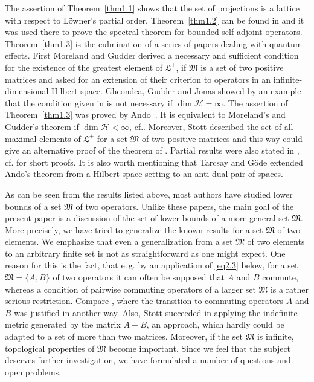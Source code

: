 \documentclass[12pt, a4paper, reqno, twoside]{amsart}
\numberwithin{equation}{section}
\newcommand{\frakL}{\mathfrak L}
\newcommand{\frakM}{\mathfrak M}
\newcommand{\eg}{\mbox{e.\,g.}\xspace}
\newcommand{\cf}{\mbox{cf.}\xspace}
\theoremstyle{definition}
\theoremstyle{remark}
\theoremstyle{mystyle}
\begin{document}
The assertion of Theorem~\ref{thm1.1} shows that the set of
projections is a lattice with respect to L\"owner's partial
order. Theorem~\ref{thm1.2} can be found in \cite[Nr.~108]{RieszNagy1973}
and it was used there to prove the spectral theorem for bounded
self-adjoint operators. Theorem~\ref{thm1.3} is the culmination of a series
of papers dealing with quantum effects. First Moreland and Gudder
\cite{MorelandGudder1999} derived a necessary and sufficient condition
for  the existence of the greatest element of $\frakL^{+}$, if  $\frakM$ is
a set  of two positive matrices and asked for an extension of their
criterion to operators in an infinite-dimensional Hilbert space.
Gheondea, Gudder and Jonas \cite{GheondeaGudderJonas2005}
showed by an example that the condition given in \cite{MorelandGudder1999} 
is not necessary if $\dim\mathscr H=\infty$. The assertion of
Theorem~\ref{thm1.3} was proved by Ando~\cite{Ando1999}. It is
equivalent to Moreland's and Gudder's theorem if $\dim\mathscr
H<\infty$, \cf \cite{Ando2005}. Moreover, Stott
\cite[Cor.~3.5]{Stott2016arxiv} described the set of all maximal
elements of  $\frakL^{+}$ for a set $\frakM$ of two positive matrices
and this way could give an alternative proof of the theorem of
\cite{MorelandGudder1999}. Partial results were also stated in 
\cite{YuanDu2006}, \cf \cite{Gheondea2007} for short proofs.
It is also worth mentioning that Tarcsay and G\"ode
\cite{TarcsayGoede2024} extended Ando's theorem from a Hilbert space
setting to an anti-dual pair of spaces.

As can be seen from the results listed above, most authors have
studied lower bounds of a set $\frakM$ of two operators. Unlike these
papers, the main goal of the present paper is a discussion of the set
of lower bounds of a more general set $\frakM$. More precisely, we
have tried to generalize the known results for a set $\frakM$ of two
elements. We emphasize that even a generalization from a set $\frakM$ 
of two elements to an arbitrary finite set is not as straightforward as
one might expect. One reason for this is the fact, that \eg by an
application of \eqref{eq2.3} below, for a set $\frakM=\{A,B\}$ of two
operators it can often be supposed that $A$ and $B$ commute, whereas a
condition of pairwise commuting operators of a larger set $\frakM$ is
a rather serious restriction. Compare \cite{Ando1999}, where the
transition to commuting operators $A$ and $B$ was justified in another way.
Also, Stott \cite{Stott2016arxiv, Stott2017dis} succeeded in
applying the indefinite metric generated by the matrix $A-B$, an
approach, which hardly could be adapted to a set of more than two
matrices. Moreover, if the set $\frakM$ is infinite, topological
properties of $\frakM$ become important. Since we feel that the
subject deserves further investigation, we have formulated a number
of questions and open problems.
\end{document}
